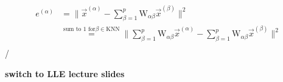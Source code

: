 \begin{frame}


\begin{align}
e^{(\alpha)} &= \lVert\vec{x}^{(\alpha)} - \sum_{\beta=1}^{p} \mathrm{W}_{\alpha \beta} \vec{x}^{(\beta)}\rVert^2\\
&\stackrel{\text{sum to 1 for} \beta \in \text{KNN}}{=} \lVert \sum_{\beta=1}^{p} \mathrm{W}_{\alpha \beta} \vec{x}^{(\alpha)} - \sum_{\beta=1}^{p} \mathrm{W}_{\alpha \beta} \vec{x}^{(\beta)}\rVert^2\\
\end{align}/

\textbf{switch to LLE lecture slides}

\end{frame}

